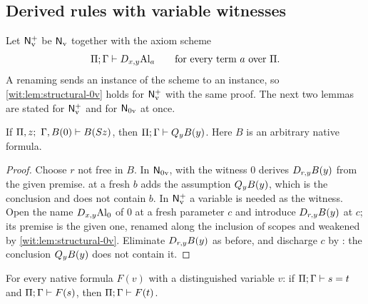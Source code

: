 \subsection{Derived rules with variable witnesses}

Let $\mathsf{N}_{\mathrm v}^{+}$ be $\mathsf{N}_{\mathrm v}$ together with the axiom
scheme
\[
 \Pi;\Gamma\vdash D_{x,y}\mathrm{Al}_a\qquad\text{for every term $a$ over
 $\Pi$.}
\]
A renaming sends an instance of the scheme to an instance, so
\cref{wit:lem:structural-0v} holds for $\mathsf{N}_{\mathrm v}^{+}$ with the same
proof.  The next two lemmas are stated for $\mathsf{N}_{\mathrm v}^{+}$ and for
$\mathsf{N}_{0\mathrm v}$ at once.

\begin{lemma}
\label{wit:lem:qc-0v}
If $\Pi,z;\ \Gamma,B(0)\vdash B(S z)$, then
$\Pi;\Gamma\vdash Q_{y}B(y)$.  Here $B$ is an arbitrary native formula.
\end{lemma}

\begin{proof}
Choose $r$ not free in $B$.  In $\mathsf{N}_{0\mathrm v}$,  with the
witness $0$ derives $D_{r,y}B(y)$ from the given premise.   at
a fresh $b$ adds the assumption $Q_{y}B(y)$, which is the conclusion and
does not contain $b$.  In $\mathsf{N}_{\mathrm v}^{+}$ a variable is needed as
the witness.  Open the name $D_{x,y}\mathrm{Al}_0$ of $0$ at a fresh
parameter $c$ and introduce $D_{r,y}B(y)$ at $c$; its premise is the given
one, renamed along the inclusion of scopes and weakened by
\cref{wit:lem:structural-0v}.  Eliminate $D_{r,y}B(y)$ as before, and
discharge $c$ by : the conclusion $Q_{y}B(y)$ does not contain
it.
\end{proof}

\begin{lemma}
\label{wit:lem:leibniz-0v}
For every native formula $F(v)$ with a distinguished variable $v$: if
$\Pi;\Gamma\vdash s=t$ and $\Pi;\Gamma\vdash F(s)$, then
$\Pi;\Gamma\vdash F(t)$.
\end{lemma}

